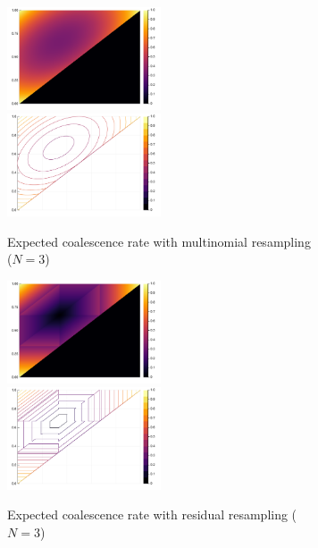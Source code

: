 \documentclass[fleqn]{article}
\theoremstyle{definition}
\begin{document}
\begin{figure}
	\centering
	\begin{subfigure}{\textwidth}
		\includegraphics[width=0.5\textwidth]{plots/EcN_mn_N3_heatmap.pdf}
		\includegraphics[width=0.5\textwidth]{plots/EcN_mn_N3_contour.pdf}
	\caption{Expected coalescence rate with multinomial resampling ($N=3$)}
	\end{subfigure}
	\begin{subfigure}{\textwidth}
		\includegraphics[width=0.5\textwidth]{plots/EcN_res_N3_heatmap.pdf}
		\includegraphics[width=0.5\textwidth]{plots/EcN_res_N3_contour.pdf}
	\caption{Expected coalescence rate with residual resampling ($N=3$)}
	\end{subfigure}
	\begin{subfigure}{\textwidth}

\end{subfigure}
\end{figure}
\end{document}
